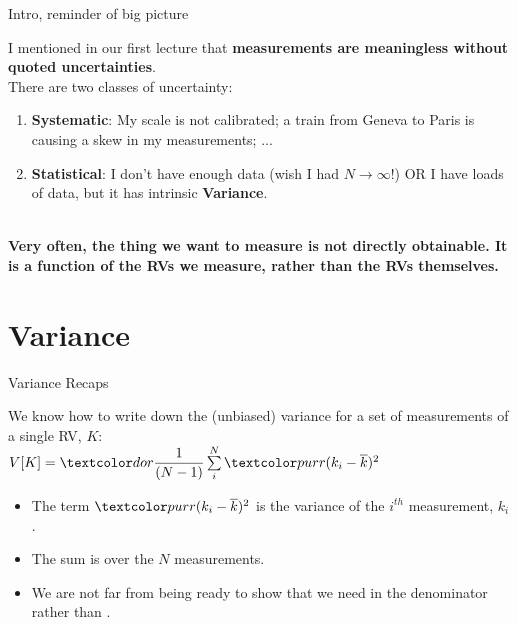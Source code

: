 \documentclass[10pt,sans,english,compress,xcolor=dvipsnames]{beamer}
\begin{document}
\begin{frame}{Intro, reminder of big picture}

\footnotesize
I mentioned in our first lecture that \textbf{measurements are meaningless without quoted uncertainties}. \\[1ex]
There are two classes of uncertainty:
\begin{enumerate}
\item \textbf{Systematic}: My scale is not calibrated; a train from Geneva to Paris is causing a skew in my measurements; ...\\
\item \textbf{Statistical}: I don't have enough data (wish I had $N\rightarrow \infty$!) OR I have loads of data, but it has intrinsic \textbf{Variance}.\\
\end{enumerate}

\\
\textbf{Very often, the thing we want to measure is not directly obtainable. It is a function of the RVs we measure, rather than the RVs themselves.  }\\[1ex]

\end{frame} 




\section{Variance}

\begin{frame}{Variance Recaps}
\footnotesize

We know how to write down the (unbiased) variance for a set of measurements of a single RV, $K$:\\[1ex]

$V[K] = \dor{\dfrac{1}{(N-1)}}\sum\limits_i^N \purp{(k_i - \overline{k})^2} $ \blu{ }\\[2ex]

\begin{itemize}
\item The term $\purp{(k_i - \overline{k})^2}$ is the variance of the $i^{th}$ measurement, $k_i$.
\item The sum is over the $N$ measurements.
\item We are not far from being ready to show that we need  in the denominator rather than .
\end{itemize}

\end{frame} 
\end{document}
